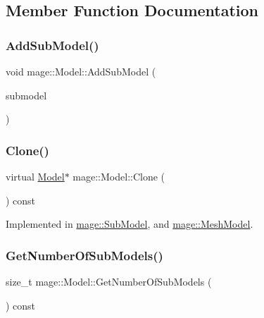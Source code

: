 \subsection{Member Function Documentation}
\hypertarget{classmage_1_1_model_abf3f207329b5d4482e515e206e856295}{}\label{classmage_1_1_model_abf3f207329b5d4482e515e206e856295} 
\subsubsection{\texorpdfstring{Add\+Sub\+Model()}{AddSubModel()}}
{\footnotesize\ttfamily void mage\+::\+Model\+::\+Add\+Sub\+Model (\begin{DoxyParamCaption}\item[{\hyperlink{classmage_1_1_sub_model}{Sub\+Model} $\ast$}]{submodel }\end{DoxyParamCaption})}

\hypertarget{classmage_1_1_model_ae5e9bee52da0db8c7a29920c13ed40ea}{}\label{classmage_1_1_model_ae5e9bee52da0db8c7a29920c13ed40ea} 
\subsubsection{\texorpdfstring{Clone()}{Clone()}}
{\footnotesize\ttfamily virtual \hyperlink{classmage_1_1_model}{Model}$\ast$ mage\+::\+Model\+::\+Clone (\begin{DoxyParamCaption}{ }\end{DoxyParamCaption}) const\hspace{0.3cm}{\ttfamily [pure virtual]}}



Implemented in \hyperlink{classmage_1_1_sub_model_a368bcc2ee819cc29ec0203e314ae91d3}{mage\+::\+Sub\+Model}, and \hyperlink{classmage_1_1_mesh_model_a7130eca9a1dac038c33b838c15138161}{mage\+::\+Mesh\+Model}.

\hypertarget{classmage_1_1_model_a29ad2496b11ef5af5f179cfe52943cd3}{}\label{classmage_1_1_model_a29ad2496b11ef5af5f179cfe52943cd3} 
\subsubsection{\texorpdfstring{Get\+Number\+Of\+Sub\+Models()}{GetNumberOfSubModels()}}
{\footnotesize\ttfamily size\+\_\+t mage\+::\+Model\+::\+Get\+Number\+Of\+Sub\+Models (\begin{DoxyParamCaption}{ }\end{DoxyParamCaption}) const}

